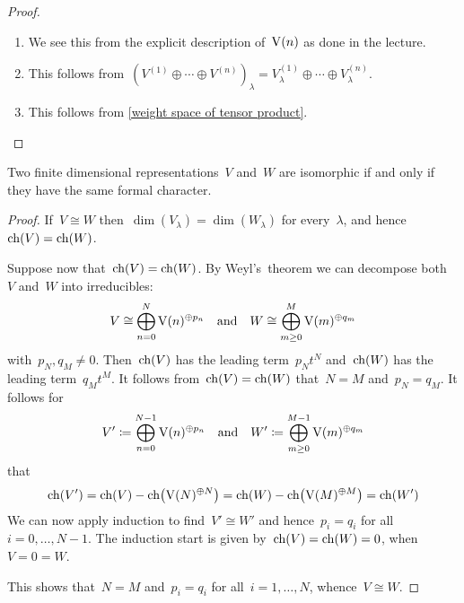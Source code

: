 \begin{proof}
  \leavevmode
  \begin{enumerate}
    \item
      We see this from the explicit description of~$\operatorname{V}(n)$ as done in the lecture.
    \item
      This follows from~$( V^{(1)} \oplus \dotsb \oplus V^{(n)} )_\lambda = V^{(1)}_\lambda \oplus \dotsb \oplus V^{(n)}_\lambda$.
    \item
      This follows from \cref{weight space of tensor product}.
    \qedhere
  \end{enumerate}
\end{proof}

\begin{proposition}
  Two finite dimensional representations~$V$ and~$W$ are isomorphic if and only if they have the same formal character.
\end{proposition}

\begin{proof}
  If~$V \cong W$ then~$\dim(V_\lambda) = \dim(W_\lambda)$ for every~$\lambda$, and hence~$\operatorname{ch}(V) = \operatorname{ch}(W)$.
  
  Suppose now that~$\operatorname{ch}(V) = \operatorname{ch}(W)$.
  By Weyl’s~theorem we can decompose both~$V$ and~$W$ into irreducibles:
  \[
    V
    \cong
    \bigoplus_{n=0}^{N} \operatorname{V}(n)^{\oplus p_n}
    \quad
    \text{and}\quad
    W
    \cong
    \bigoplus_{m \geq 0}^{M} \operatorname{V}(m)^{\oplus q_m}
  \]
  with~$p_{N}, q_{M} \neq 0$.
  Then~$\operatorname{ch}(V)$ has the leading term~$p_N t^N$ and~$\operatorname{ch}(W)$ has the leading term~$q_M t^M$.
  It follows from~$\operatorname{ch}(V) = \operatorname{ch}(W)$ that~$N = M$ and~$p_N = q_M$.
  It follows for
  \[
    V'
    \coloneqq
    \bigoplus_{n=0}^{N-1} \operatorname{V}(n)^{\oplus p_n}
    \quad
    \text{and}\quad
    W'
    \coloneqq
    \bigoplus_{m \geq 0}^{M-1} \operatorname{V}(m)^{\oplus q_m}
  \]
  that
  \[
    \operatorname{ch}(V')
    =
    \operatorname{ch}(V) - \operatorname{ch}\bigl( \operatorname{V}(N)^{\oplus N} \bigr)
    =
    \operatorname{ch}(W) - \operatorname{ch}\bigl( \operatorname{V}(M)^{\oplus M} \bigr)
    =
    \operatorname{ch}(W')
  \]
  We can now apply induction to find~$V' \cong W'$ and hence~$p_i = q_i$ for all~$i = 0, \dotsc, N-1$.
  The induction start is given by~$\operatorname{ch}(V) = \operatorname{ch}(W) = 0$, when~$V = 0 = W$.
  
  This shows that~$N = M$ and~$p_i = q_i$ for all~$i = 1, \dotsc, N$, whence~$V \cong W$.
\end{proof}

